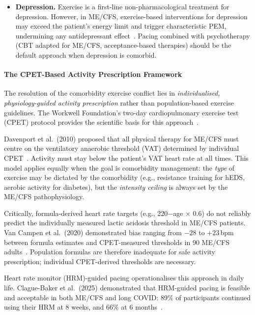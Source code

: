 \begin{itemize}
    \item \textbf{Depression.} Exercise is a first-line non-pharmacological
      treatment for depression. However, in ME/CFS, exercise-based
      interventions for depression may exceed the patient's energy limit and
      trigger characteristic PEM, undermining any antidepressant
      effect~\cite{FrontiersDepCFS2025}. Pacing combined with psychotherapy
      (CBT adapted for ME/CFS, acceptance-based therapies) should be the
      default approach when depression is comorbid.
\end{itemize}

\paragraph{The CPET-Based Activity Prescription Framework}

The resolution of the comorbidity exercise conflict lies in
\emph{individualised, physiology-guided activity prescription} rather than
population-based exercise guidelines. The Workwell Foundation's two-day
cardiopulmonary exercise test (CPET) protocol provides the scientific basis
for this approach~\cite{Stevens2018CPETmethod, Davenport2010PTmodel}.

Davenport et al.\ (2010) proposed that all physical therapy for ME/CFS must
centre on the ventilatory anaerobic threshold (VAT) determined by individual
CPET~\cite{Davenport2010PTmodel}. Activity must stay below the patient's VAT
heart rate at all times. This model applies equally when the goal is
comorbidity management: the \emph{type} of exercise may be dictated by the
comorbidity (e.g., resistance training for hEDS, aerobic activity for
diabetes), but the \emph{intensity ceiling} is always set by the ME/CFS
pathophysiology.

Critically, formula-derived heart rate targets (e.g., 220$-$age $\times$
0.6) do not reliably predict the individually measured lactic acidosis
threshold in ME/CFS patients. Van Campen et al.\ (2020) demonstrated bias
ranging from $-28$ to $+23$\,bpm between formula estimates and CPET-measured
thresholds in 90 ME/CFS adults~\cite{vanCampen2020HRpacing}. Population
formulas are therefore inadequate for safe activity prescription; individual
CPET-derived thresholds are necessary.

Heart rate monitor (HRM)-guided pacing operationalises this approach in daily
life. Clague-Baker et al.\ (2025) demonstrated that HRM-guided pacing is
feasible and acceptable in both ME/CFS and long COVID: 89\% of participants
continued using their HRM at 8 weeks, and 66\% at 6
months~\cite{ClagueBaker2025HRMpacing}.


